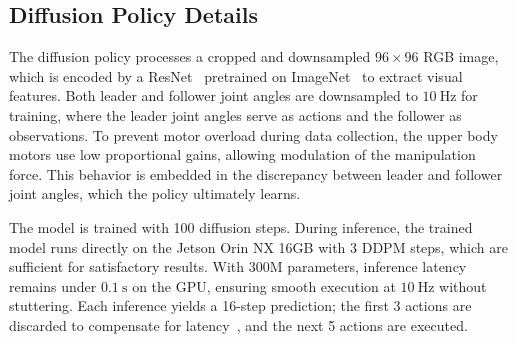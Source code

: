 \subsection{Diffusion Policy Details}
\label{sec:dp_details}


The diffusion policy processes a cropped and downsampled $96\times96$ RGB image, which is encoded by a ResNet~\citep{he2016deep} pretrained on ImageNet~\citep{deng2009imagenet} to extract visual features. Both leader and follower joint angles are downsampled to $10~\mathrm{Hz}$ for training, where the leader joint angles serve as actions and the follower as observations.
To prevent motor overload during data collection, the upper body motors use low proportional gains, allowing modulation of the manipulation force. This behavior is embedded in the discrepancy between leader and follower joint angles, which the policy ultimately learns.



The model is trained with 100 diffusion steps. During inference, the trained model runs directly on the Jetson Orin NX 16GB with 3 DDPM steps, which are sufficient for satisfactory results. With 300M parameters, inference latency remains under $0.1~\mathrm{s}$ on the GPU, ensuring smooth execution at $10~\mathrm{Hz}$ without stuttering. Each inference yields a 16-step prediction; the first 3 actions are discarded to compensate for latency~\citep{chi2024universal}, and the next 5 actions are executed.
